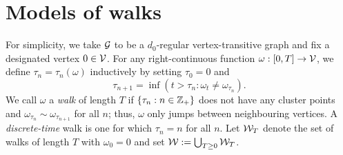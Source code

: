 
\section{Models of walks}

For simplicity, we take $\mathcal{G}$ to be a $d_0$-regular vertex-transitive graph and fix a designated vertex $0 \in \mathcal{V}$.
For any right-continuous function $\omega : [0, T] \rightarrow \mathcal{V}$, we define
$\tau_n = \tau_n(\omega)$ inductively by setting $\tau_0 = 0$ and
\begin{equation}
\tau_{n+1} = \inf(t > \tau_n : \omega_t \ne \omega_{\tau_n}).
\end{equation}
We call $\omega$ a \emph{walk} of length $T$ if
$\{ \tau_n : n \in {\mathbb Z}_+ \}$ does not have any cluster points and
$\omega_{\tau_n} \sim \omega_{\tau_{n+1}}$ for all $n$; thus, $\omega$
only jumps between neighbouring vertices.
A \emph{discrete-time} walk is one for which $\tau_n = n$ for all $n$.
Let $\mathcal{W}_T$ denote the set of walks of length $T$ with $\omega_0 = 0$ and set $\mathcal{W} := \bigcup_{T \geq 0} \mathcal{W}_T$.

